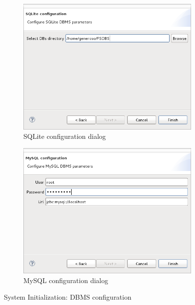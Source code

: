 \documentclass[twoside]{article}
\begin{document}
\begin{sloppypar}
\begin{figure}[h!]
 \centering
 \begin{subfigure}[c]{0.46\textwidth}
    \includegraphics[width=1.0\textwidth]{images/dbms_configuration_sqlite.png}
    \caption{SQLite configuration dialog}
    \label{fig:dbms_configuration_sqlite}
 \end{subfigure}%
 \hspace{30pt}
 \begin{subfigure}[c]{0.46\textwidth}
    \includegraphics[width=1.0\textwidth]{images/dbms_configuration_mysql.png}
    \caption{MySQL configuration dialog}
    \label{fig:dbms_configuration_mysql}         
 \end{subfigure}
 \caption{System Initialization: DBMS configuration}
 \label{fig:dbms_configuration}       
\end{figure}


\end{sloppypar}
\end{document}
